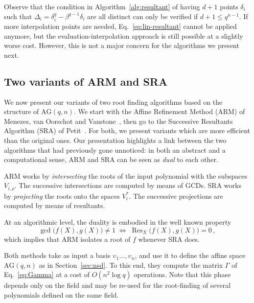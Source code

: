 \documentclass{sig-alternate}
\newcommand{\dd}{d}
\newcommand{\qq}{q}
\newcommand{\nn}{n}
\newcommand{\AG}{\mathrm{AG}(\qq,\nn)}
\DeclareMathOperator{\Res}{Res}
\newcounter{algo}
\renewcommand{\paragraph}[1]{\smallskip\noindent{{\bf \rm #1.}}}
\begin{document}
Observe that the condition in Algorithm~\ref{alg:resultant} of having
$\dd+1$ points $\delta_i$ such that
$\Delta_i=\delta_i^\qq-\beta^{\qq-1}\delta_i$ are all distinct can
only be verified if $\dd+1\le\qq^{\nn-1}$. If more interpolation
points are needed, Eq.~\eqref{eq:lin-resultant} cannot be applied
anymore, but the evaluation-interpolation approach is still possible
at a slightly worse cost. However, this is not a major concern for the
algorithms we present next.



\subsection{Two variants of ARM and SRA}

We now present our variants of two root finding algorithms based on
the structure of $\AG$. We start with the Affine
Refinement Method (ARM) of Menezes, van Oorschot and
Vanstone~\cite{Menvanovans92}, then go to the Successive Resultants
Algorithm (SRA) of Petit~\cite{cgUCL-P14}. For both, we present
variants which are more efficient than the original ones. Our
presentation highlights a link between the two algorithms that had
previously gone unnoticed: in both an abstract and a computational
sense, ARM and SRA can be seen as \emph{dual} to each other.

ARM works by \emph{intersecting} the roots of the input polynomial
with the subspaces $V_{i,\rho}$. The successive intersections are
computed by means of GCDs.  SRA works by \emph{projecting} the roots
onto the spaces $V_i^\ast$.  The successive projections are computed
by means of resultants.

At an algorithmic level, the duality is embodied in the well known
property
\begin{equation}
  \gcd\bigl(f(X),g(X)\bigr) \ne 1 \;\Leftrightarrow\; \Res_X\bigl(f(X),g(X)\bigr)=0\,,
\end{equation}
which implies that ARM isolates a root of $f$ whenever SRA does.

\paragraph{Pre-computation} Both methods take as input a basis
$\upsilon_1\dots,\upsilon_\nn$, and use it to define the affine space
$\AG$ as in Section~\ref{sec:nsd}. To this end, they compute the
matrix $\Gamma$ of Eq.~\eqref{eq:Gamma} at a cost of $O(n^2\log q)$
operations. Note that this phase depends only on the field and may be
re-used for the root-finding of several polynomials defined on the
same field.
\end{document}
